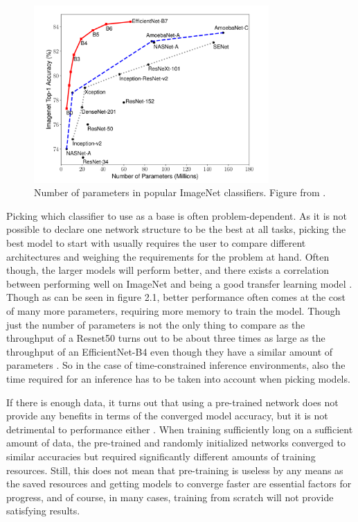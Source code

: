 \begin{figure}[h!]
    \centering
    \includegraphics[width=0.8\textwidth]{imgs/imagenet_parameters.png}
    \caption{Number of parameters in popular ImageNet classifiers. Figure from \citep{efficientNet}.\label{fig:params}}
\end{figure}

Picking which classifier to use as a base is often problem-dependent. As it is not possible to declare one network structure to be the best at all tasks, picking the best model to start with usually requires the user to compare different architectures and weighing the requirements for the problem at hand. Often though, the larger models will perform better, and there exists a correlation between performing well on ImageNet and being a good transfer learning model \citep{betterTransfer}. Though as can be seen in figure 2.1, better performance often comes at the cost of many more parameters, requiring more memory to train the model. Though just the number of parameters is not the only thing to compare as the throughput of a Resnet50 \citep{resNet} turns out to be about three times as large as the throughput of an EfficientNet-B4 \citep{efficientNet} even though they have a similar amount of parameters \citep{classifierPerformance}. So in the case of time-constrained inference environments, also the time required for an inference has to be taken into account when picking models.

If there is enough data, it turns out that using a pre-trained network does not provide any benefits in terms of the converged model accuracy, but it is not detrimental to performance either \citep{rethinkTransfer}. When training sufficiently long on a sufficient amount of data, the pre-trained and randomly initialized networks converged to similar accuracies but required significantly different amounts of training resources. Still, this does not mean that pre-training is useless by any means as the saved resources and getting models to converge faster are essential factors for progress, and of course, in many cases, training from scratch will not provide satisfying results.


